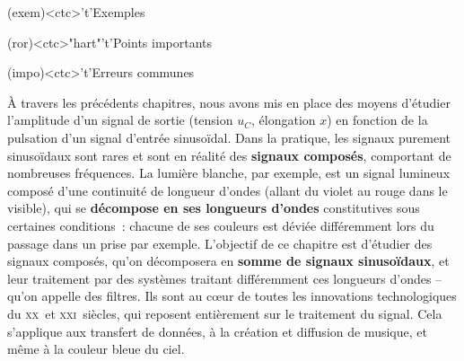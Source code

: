 \documentclass[../../main/main.tex]{subfiles}
\begin{document}
\begin{tcn}[%
		sidebyside, fontupper=\small, fontlower=\small
	]
	\begin{tcn}[nsp](exem)<ctc>'t'{Exemples}
		\vspace{-25pt}
	\end{tcn}
	\begin{tcn}[nsp](ror)<ctc>"hart"'t'{Points importants}
		\vspace{-25pt}
	\end{tcn}
	\begin{tcn}[nsp](impo)<ctc>'t'{Erreurs communes}
		\vspace{-25pt}
	\end{tcn}
\end{tcn}

\vspace*{\fill}

À travers les précédents chapitres, nous avons mis en place des moyens d'étudier
l'amplitude d'un signal de sortie (tension $u_C$, élongation $x$) en fonction de
la pulsation d'un signal d'entrée sinusoïdal. Dans la pratique, les signaux
purement sinusoïdaux sont rares et sont en réalité des \textbf{signaux
	composés}, comportant de nombreuses fréquences. La lumière blanche, par exemple,
est un signal lumineux composé d'une continuité de longueur d'ondes (allant du
violet au rouge dans le visible), qui se \textbf{décompose en ses longueurs
	d'ondes} constitutives sous certaines conditions~: chacune de ses couleurs est
déviée différemment lors du passage dans un prise par exemple.
\bigbreak
L'objectif de ce chapitre est d'étudier des signaux composés, qu'on décomposera
en \textbf{somme de signaux sinusoïdaux}, et leur traitement par des systèmes
traitant différemment ces longueurs d'ondes -- qu'on appelle des filtres. Ils
sont au cœur de toutes les innovations technologiques du \textsc{xx}\ieme\ et
\textsc{xxi}\ieme\ siècles, qui reposent entièrement sur le traitement du
signal. Cela s'applique aux transfert de données, à la création et diffusion de
musique, et même à la couleur bleue du ciel.
\end{document}

